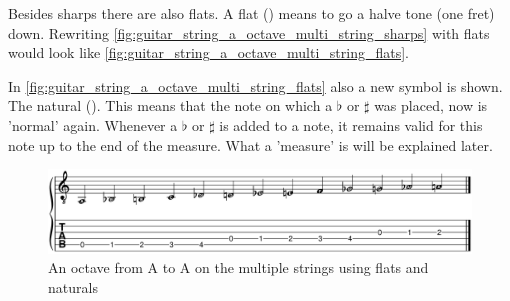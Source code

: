 Besides sharps there are also flats. A flat (\flat) means to go a halve tone (one fret) down. Rewriting \autoref{fig:guitar_string_a_octave_multi_string_sharps} with flats would look like \autoref{fig:guitar_string_a_octave_multi_string_flats}.

In \autoref{fig:guitar_string_a_octave_multi_string_flats} also a new symbol is shown. The natural (\natural). This means that the note on which a $\flat$ or $\sharp$ was placed, now is 'normal' again. Whenever a $\flat$ or $\sharp$ is added to a note, it remains valid for this note up to the end of the measure. What a 'measure' is will be explained later.

\begin{figure}[h]
	\centering
	\includegraphics[width=\textwidth]{../../MuseScore/Guitar/PitchesFlatsMultiString.png}
	\caption{An octave from A to A on the multiple strings using flats and naturals}
	\label{fig:guitar_string_a_octave_multi_string_flats}
\end{figure}